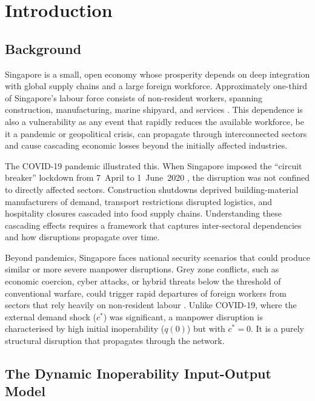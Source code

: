 
\chapter{Introduction}

\section{Background}

Singapore is a small, open economy whose prosperity depends on deep integration with global supply chains and a large foreign workforce. Approximately one-third of Singapore's labour force consists of non-resident workers, spanning construction, manufacturing, marine shipyard, and services \cite{MOM2023ForeignWorkforce}. This dependence is also a vulnerability as any event that rapidly reduces the available workforce, be it a pandemic or geopolitical crisis, can propagate through interconnected sectors and cause cascading economic losses beyond the initially affected industries.

The COVID-19 pandemic illustrated this. When Singapore imposed the ``circuit breaker'' lockdown from 7~April to 1~June~2020 \cite{MOH2020EndCircuitBreaker,MOH2020PostCircuitBreakerMeasures}, the disruption was not confined to directly affected sectors. Construction shutdowns deprived building-material manufacturers of demand, transport restrictions disrupted logistics, and hospitality closures cascaded into food supply chains. Understanding these cascading effects requires a framework that captures inter-sectoral dependencies and how disruptions propagate over time.

Beyond pandemics, Singapore faces national security scenarios that could produce similar or more severe manpower disruptions. Grey zone conflicts, such as economic coercion, cyber attacks, or hybrid threats below the threshold of conventional warfare, could trigger rapid departures of foreign workers from sectors that rely heavily on non-resident labour \cite{MINDEF2020Factsheet}. Unlike COVID-19, where the external demand shock ($c^{*}$) was significant, a manpower disruption is characterised by high initial inoperability ($q(0)$) but with $c^{*}=0$. It is a purely structural disruption that propagates through the network.

\section{The Dynamic Inoperability Input-Output Model}


